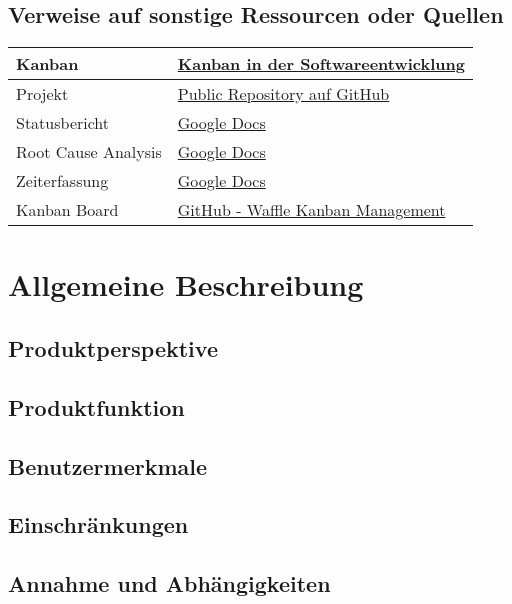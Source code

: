 \documentclass[a4paper]{book}
\begin{document}
\section{Verweise auf sonstige Ressourcen oder Quellen}
\begin{center}
\begin{tabular}{|p{3cm}|p{8cm}|}
\hline
Kanban & \href{http://de.wikipedia.org/wiki/Kanban_(Softwareentwicklung)}{Kanban in der Softwareentwicklung} \\
\hline
Projekt & \href{https://github.com/chronos38/libipc-}{Public Repository auf GitHub} \\
\hline
Statusbericht & \href{docs.google.com}{Google Docs} \\
\hline
Root Cause Analysis & \href{docs.google.com}{Google Docs} \\
\hline
Zeiterfassung & \href{docs.google.com}{Google Docs} \\
\hline
Kanban Board & \href{https://waffle.io/chronos38/libipc-}{GitHub - Waffle Kanban Management} \\
\hline
\end{tabular}
\end{center}

\chapter{Allgemeine Beschreibung}
\blindtext

\section{Produktperspektive}
\blindtext

\section{Produktfunktion}
\blindtext

\section{Benutzermerkmale}
\blindtext

\section{Einschränkungen}
\blindtext

\section{Annahme und Abhängigkeiten}
\blindtext
\end{document}
